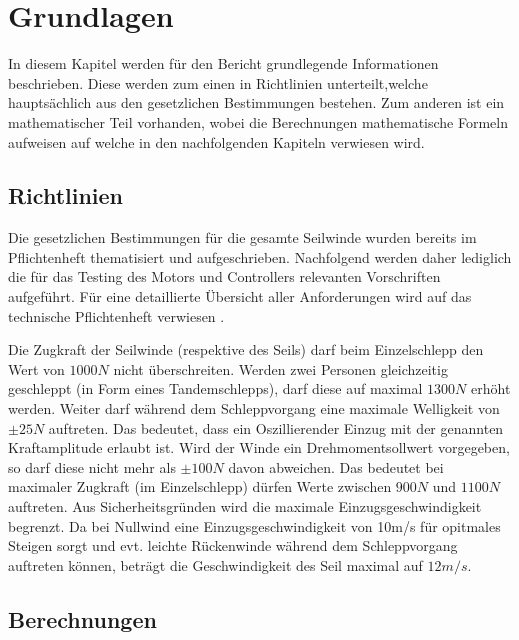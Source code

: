 \section{Grundlagen}\label{sec:Grundlagen}
In diesem Kapitel werden für den Bericht grundlegende Informationen beschrieben. Diese werden zum einen in Richtlinien unterteilt,welche hauptsächlich aus den gesetzlichen Bestimmungen bestehen. Zum anderen ist ein mathematischer Teil vorhanden, wobei die Berechnungen mathematische Formeln aufweisen auf welche in den nachfolgenden Kapiteln verwiesen wird. 

\subsection{Richtlinien}\label{subsec:Richtlinien}
Die gesetzlichen Bestimmungen für die gesamte Seilwinde wurden bereits im Pflichtenheft thematisiert und aufgeschrieben. Nachfolgend werden daher lediglich die für das Testing des Motors und Controllers relevanten Vorschriften aufgeführt. Für eine detaillierte Übersicht aller Anforderungen wird auf das technische Pflichtenheft verwiesen \cite{TechPflichtenheft}.

Die Zugkraft der Seilwinde (respektive des Seils) darf beim Einzelschlepp den Wert von $ 1000N $ nicht überschreiten. Werden zwei Personen gleichzeitig geschleppt (in Form eines Tandemschlepps), darf diese auf maximal $ 1300N $ erhöht werden. Weiter darf während dem Schleppvorgang eine maximale Welligkeit von $\pm 25N$ auftreten. Das bedeutet, dass ein Oszillierender Einzug mit der genannten Kraftamplitude erlaubt ist. Wird der Winde ein Drehmomentsollwert vorgegeben, so darf diese nicht mehr als $\pm 100N$ davon abweichen. Das bedeutet bei maximaler Zugkraft (im Einzelschlepp) dürfen Werte zwischen $ 900N $ und $ 1100N $ auftreten. Aus Sicherheitsgründen wird die maximale Einzugsgeschwindigkeit begrenzt. Da bei Nullwind eine Einzugsgeschwindigkeit von 10m/s für opitmales Steigen sorgt und evt. leichte Rückenwinde während dem Schleppvorgang auftreten können, beträgt die Geschwindigkeit des Seil maximal auf $ 12m/s $.



\subsection{Berechnungen}\label{subsec:Berechnungen}


